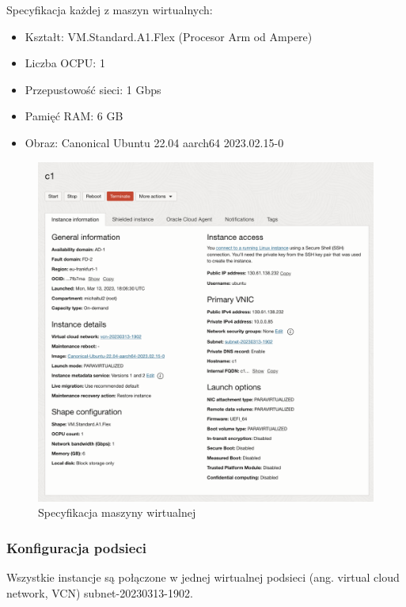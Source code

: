 \begin{samepage}
    Specyfikacja każdej z maszyn wirtualnych:
    \begin{itemize}
        \item Kształt: VM.Standard.A1.Flex (Procesor Arm od Ampere)
        \item Liczba OCPU: 1
        \item Przepustowość sieci: 1 Gbps
        \item Pamięć RAM: 6 GB
        \item Obraz: Canonical Ubuntu 22.04 aarch64 2023.02.15-0
    \end{itemize}

    \begin{figure}[H]
        \centering
        \includegraphics[width=\textwidth]{img/oci-instance-details}
        \caption{Specyfikacja maszyny wirtualnej}
        \label{fig:oci-instance-details}
    \end{figure}
\end{samepage}


\subsubsection{Konfiguracja podsieci}

Wszystkie instancje są połączone w jednej wirtualnej podsieci (ang. virtual cloud network, VCN) subnet-20230313-1902.

